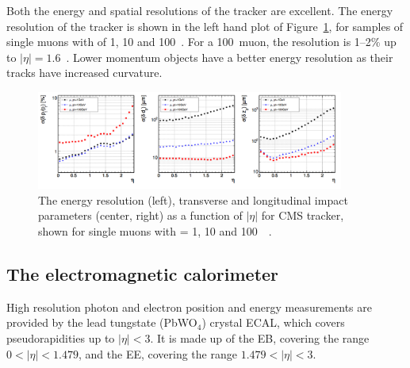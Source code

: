Both the energy and spatial resolutions of the tracker are excellent. 
The energy resolution of the tracker is shown in the left hand plot of Figure~\ref{fig:CMStrackerRes}, 
for samples of single muons with \pt of 1, 10 and 100~\GeV. 
For a 100~\GeV muon, the resolution is 1--2\% up to $|\eta| = 1.6$~\cite{Chatrchyan:2008zzk}. 
Lower momentum objects have a better energy resolution as their tracks have increased curvature. 

\begin{figure}[htbp]
  \begin{center}
  \includegraphics[width=0.9\textwidth]{Figures/detector/cmstrackerResAll}
  \caption{The energy resolution (left), transverse and longitudinal impact parameters (center, right) as a function of $|\eta|$ for \ac{CMS} tracker, 
  shown for single muons with \pt = 1, 10 and 100~\GeV~\cite{Chatrchyan:2008zzk}.
}
  \label{fig:CMStrackerRes}
  \end{center}
\end{figure}


\subsection{The electromagnetic calorimeter}
High resolution photon and electron position and energy measurements are provided by the lead tungstate (PbWO$_{4}$) crystal \ac{ECAL}, which covers pseudorapidities up to $|\eta|<3$.
It is made up of the \ac{EB}, covering the range $0<|\eta|<1.479$,
and the \ac{EE}, covering the range $1.479<|\eta|<3$.

